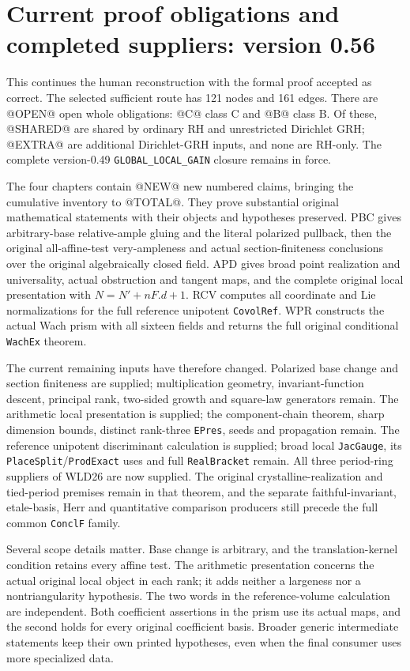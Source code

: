 \section{Current proof obligations and completed suppliers: version 0.56}
\label{sec:dependency-audit-v56}

This continues the human reconstruction with the formal proof accepted
as correct. The selected sufficient route has 121 nodes and 161 edges.
There are @OPEN@ open whole obligations: @C@ class C and @B@ class B.
Of these, @SHARED@ are shared by ordinary RH and unrestricted Dirichlet
GRH; @EXTRA@ are additional Dirichlet-GRH inputs, and none are RH-only.
The complete version-0.49 \texttt{GLOBAL\_LOCAL\_GAIN} closure remains
in force.

The four chapters contain @NEW@ new numbered claims, bringing the
cumulative inventory to @TOTAL@. They prove substantial original
mathematical statements with their objects and hypotheses preserved.
PBC gives arbitrary-base relative-ample gluing and the literal
polarized pullback, then the original all-affine-test very-ampleness
and actual section-finiteness conclusions over the original algebraically
closed field. APD gives broad point
realization and universality, actual obstruction and tangent maps,
and the complete original local presentation with
$N=N'+nF.d+1$. RCV computes all coordinate and Lie normalizations
for the full reference unipotent \texttt{CovolRef}. WPR constructs
the actual Wach prism with all sixteen fields and returns the full
original conditional \texttt{WachEx} theorem.

The current remaining inputs have therefore changed. Polarized base
change and section finiteness are supplied; multiplication geometry,
invariant-function descent, principal rank, two-sided growth and
square-law generators remain. The arithmetic local presentation is
supplied; the component-chain theorem, sharp dimension bounds, distinct
rank-three \texttt{EPres}, seeds and propagation remain. The reference
unipotent discriminant calculation is supplied; broad local
\texttt{JacGauge}, its \texttt{PlaceSplit}/\texttt{ProdExact} uses
and full \texttt{RealBracket} remain. All three period-ring suppliers
of WLD26 are now supplied. The original crystalline-realization and
tied-period premises remain in that theorem, and the separate
faithful-invariant, etale-basis, Herr and quantitative comparison
producers still precede the full common \texttt{ConclF} family.

Several scope details matter. Base change is arbitrary, and the
translation-kernel condition retains every affine test. The arithmetic
presentation concerns the actual original local object in each rank;
it adds neither a largeness nor a nontriangularity hypothesis.
The two words in the reference-volume calculation are independent.
Both coefficient assertions in the prism use its actual maps, and
the second holds for every original coefficient basis. Broader generic
intermediate statements keep their own printed hypotheses, even when
the final consumer uses more specialized data.

